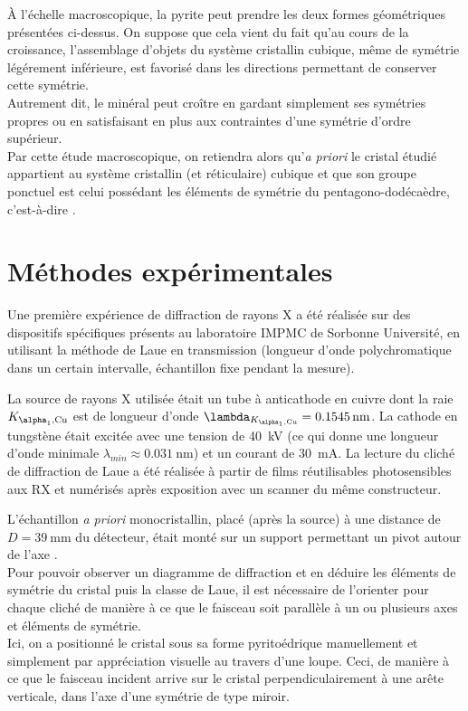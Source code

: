 À l'échelle macroscopique, la pyrite peut prendre les deux formes géométriques présentées ci-dessus. On suppose que cela vient du fait qu'au cours de la croissance, l'assemblage d'objets du système cristallin cubique, même de symétrie légérement inférieure, est favorisé dans les directions permettant de conserver cette symétrie.\\
Autrement dit, le minéral peut croître en gardant simplement ses symétries propres ou en satisfaisant en plus aux contraintes d'une symétrie d'ordre supérieur.\\
Par cette étude macroscopique, on retiendra alors qu'\textit{a priori} le cristal étudié appartient au système cristallin (et réticulaire) cubique et que son groupe ponctuel est celui possédant les éléments de symétrie du pentagono-dodécaèdre, c'est-à-dire .

\section{Méthodes expérimentales}

Une première expérience de diffraction de rayons X a été réalisée sur des dispositifs spécifiques présents au laboratoire IMPMC de Sorbonne Université, en utilisant la méthode de Laue en transmission (longueur d'onde polychromatique dans un certain intervalle, échantillon fixe pendant la mesure).

La source de rayons X utilisée était un tube à anticathode en cuivre dont la raie \(K_{\alpha_1,\ce{Cu}}\) est de longueur d'onde \(\lambda_{K_{\alpha_1,\ce{Cu}}}=\SI{0.1545}{\nano\metre}\). La cathode en tungstène était excitée avec une tension de \SI{40}{\kilo\volt} (ce qui donne une longueur d'onde minimale \(\lambda_{min} \approx \SI{0.031}{\nano\metre}\)) et un courant de \SI{30}{\milli\ampere}. La lecture du cliché de diffraction de Laue a été réalisée à partir de films réutilisables photosensibles aux RX et numérisés après exposition avec un scanner du même constructeur.

L'échantillon \textit{a priori} monocristallin, placé (après la source) à une distance de \(D = \SI{39}{\milli\metre}\) du détecteur, était monté sur un support permettant un pivot autour de l'axe \hmn{[hkl]}.\\
Pour pouvoir observer un diagramme de diffraction et en déduire les éléments de symétrie du cristal puis la classe de Laue, il est nécessaire de l'orienter pour chaque cliché de manière à ce que le faisceau soit parallèle à un ou plusieurs axes et éléments de symétrie.\\
Ici, on a positionné le cristal sous sa forme pyritoédrique manuellement et simplement par appréciation visuelle au travers d'une loupe. Ceci, de manière à ce que le faisceau incident arrive sur le cristal perpendiculairement à une arête verticale, dans l'axe d'une symétrie de type miroir.\\



